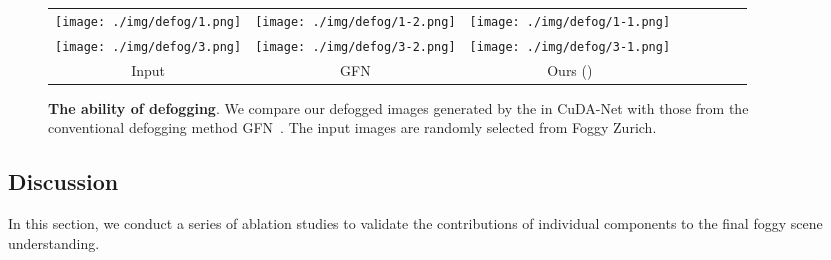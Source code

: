 \documentclass[10pt,twocolumn,letterpaper]{article}
\begin{document}
\begin{table}[!t]
\begin{center}
\caption{\textbf{Different selection schemes for constructing  domain.} We set three random seeds to ensure fair comparison and test the trained model on Foggy Zurich-test dataset.}
\label{tab:selection}
\vspace{-2mm}
\vspace{-6mm}
\end{center}
\end{table}

\begin{figure}[!ht]
\centering
		\tabcolsep=0.5pt
		\renewcommand\arraystretch{0.5}
		\begin{tabular}{cccccccc}
			\texttt{[image: ./img/defog/1.png]} &
			\texttt{[image: ./img/defog/1-2.png]} &
			\texttt{[image: ./img/defog/1-1.png]} 
			
			\\
\texttt{[image: ./img/defog/3.png]} &
			\texttt{[image: ./img/defog/3-2.png]} &
			\texttt{[image: ./img/defog/3-1.png]} 
			 \\
			Input & GFN &  Ours () \\
	\end{tabular}
	\vspace{-2mm}
    \caption{\textbf{The ability of defogging}. We compare our defogged images generated by the  in CuDA-Net with those from the conventional defogging method GFN~\cite{ren2018gated}. The input images are randomly selected from {Foggy Zurich}.}
    \vspace{-4mm}
    \label{fig:defog}
\end{figure}

\subsection{Discussion}
In this section, we conduct a series of ablation studies to validate the contributions of individual components to the final foggy scene understanding. 
\end{document}
